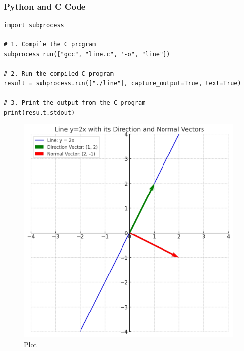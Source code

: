 \documentclass{beamer}
\begin{document}
\begin{frame}[fragile]
\frametitle{Python and C Code}

\begin{lstlisting}
import subprocess

# 1. Compile the C program
subprocess.run(["gcc", "line.c", "-o", "line"])

# 2. Run the compiled C program
result = subprocess.run(["./line"], capture_output=True, text=True)

# 3. Print the output from the C program
print(result.stdout)
\end{lstlisting}
\end{frame}
\begin{frame}
\begin{figure}
    \centering
    \includegraphics[width=0.75\columnwidth]{graph-6.jpg}
    \caption{Plot}
    \label{fig:placeholder}
\end{figure}
\end{frame}
\end{document}
